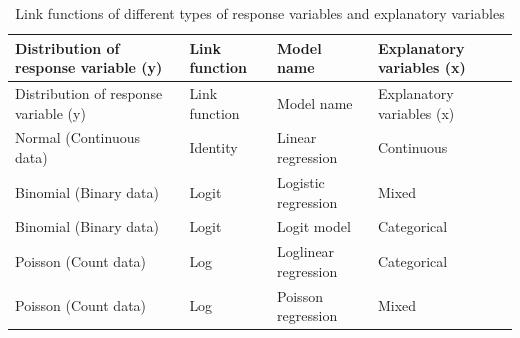 \documentclass[
]{book}
\begin{document}
\begin{longtable}[]{@{}
  >{\raggedright\arraybackslash}p{}
  >{\raggedright\arraybackslash}p{}
  >{\raggedright\arraybackslash}p{}
  >{\raggedright\arraybackslash}p{}@{}}
\caption{\label{tab:link-function} Link functions of different types of response variables and explanatory variables}\tabularnewline
\toprule\noalign{}
\begin{minipage}[b]{\linewidth}\raggedright
Distribution of response variable (y)
\end{minipage} & \begin{minipage}[b]{\linewidth}\raggedright
Link function
\end{minipage} & \begin{minipage}[b]{\linewidth}\raggedright
Model name
\end{minipage} & \begin{minipage}[b]{\linewidth}\raggedright
Explanatory variables (x)
\end{minipage} \\
\midrule\noalign{}
\endfirsthead
\toprule\noalign{}
\begin{minipage}[b]{\linewidth}\raggedright
Distribution of response variable (y)
\end{minipage} & \begin{minipage}[b]{\linewidth}\raggedright
Link function
\end{minipage} & \begin{minipage}[b]{\linewidth}\raggedright
Model name
\end{minipage} & \begin{minipage}[b]{\linewidth}\raggedright
Explanatory variables (x)
\end{minipage} \\
\midrule\noalign{}
\endhead
\bottomrule\noalign{}
\endlastfoot
Normal (Continuous data) & Identity & Linear regression & Continuous \\
Binomial (Binary data) & Logit & Logistic regression & Mixed \\
Binomial (Binary data) & Logit & Logit model & Categorical \\
Poisson (Count data) & Log & Loglinear regression & Categorical \\
Poisson (Count data) & Log & Poisson regression & Mixed \\
\end{longtable}
\end{document}
